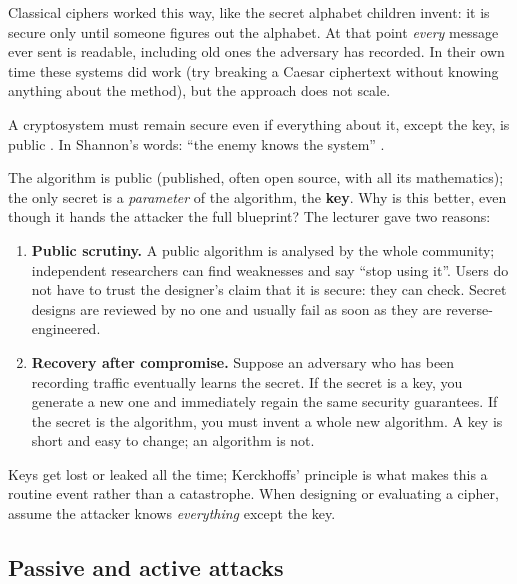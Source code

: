 Classical ciphers worked this way, like the secret alphabet children invent: it is secure only until someone figures out the alphabet. At that point \emph{every} message ever sent is readable, including old ones the adversary has recorded. In their own time these systems did work (try breaking a Caesar ciphertext without knowing anything about the method), but the approach does not scale.

\begin{definition}
A cryptosystem must remain secure even if everything about it, except the key, is public \cite{kerckhoffs1883}. In Shannon's words: \enquote{the enemy knows the system} \cite{shannon1949}.
\end{definition}

The algorithm is public (published, often open source, with all its mathematics); the only secret is a \emph{parameter} of the algorithm, the \textbf{key}. Why is this better, even though it hands the attacker the full blueprint? The lecturer gave two reasons:
\begin{enumerate}
    \item \textbf{Public scrutiny.} A public algorithm is analysed by the whole community; independent researchers can find weaknesses and say \enquote{stop using it}. Users do not have to trust the designer's claim that it is secure: they can check. Secret designs are reviewed by no one and usually fail as soon as they are reverse-engineered.
    \item \textbf{Recovery after compromise.} Suppose an adversary who has been recording traffic eventually learns the secret. If the secret is a key, you generate a new one and immediately regain the same security guarantees. If the secret is the algorithm, you must invent a whole new algorithm. A key is short and easy to change; an algorithm is not.
\end{enumerate}

\begin{remark}
Keys get lost or leaked all the time; Kerckhoffs' principle is what makes this a routine event rather than a catastrophe. When designing or evaluating a cipher, assume the attacker knows \emph{everything} except the key.
\end{remark}

\subsection{Passive and active attacks}

